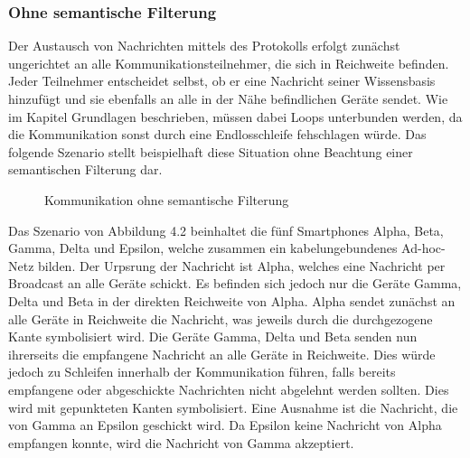 \subsubsection{Ohne semantische Filterung}
Der Austausch von Nachrichten mittels des Protokolls erfolgt zunächst ungerichtet an alle Kommunikationsteilnehmer, die sich in Reichweite befinden. Jeder Teilnehmer entscheidet selbst, ob er eine Nachricht seiner Wissensbasis hinzufügt und sie ebenfalls an alle in der Nähe befindlichen Geräte sendet. Wie im Kapitel Grundlagen beschrieben, müssen dabei Loops unterbunden werden, da die Kommunikation sonst durch eine Endlosschleife fehschlagen würde. Das folgende Szenario stellt beispielhaft diese Situation ohne Beachtung einer semantischen  Filterung dar.
\begin{figure}[H]
	\centering
	\hspace*{1cm}
	\caption{Kommunikation ohne semantische Filterung}
	\label{fig:beispielszenario}
\end{figure}
Das Szenario von Abbildung 4.2 beinhaltet die fünf Smartphones Alpha, Beta, Gamma, Delta und Epsilon, welche zusammen ein kabelungebundenes Ad-hoc-Netz bilden. Der Urpsrung der Nachricht ist Alpha, welches eine Nachricht per Broadcast an alle Geräte schickt. Es befinden sich jedoch nur die Geräte Gamma, Delta und Beta in der direkten Reichweite von Alpha. Alpha sendet zunächst an alle Geräte in Reichweite die Nachricht, was jeweils durch die durchgezogene Kante symbolisiert wird. Die Geräte Gamma, Delta und Beta senden nun ihrerseits die empfangene Nachricht an alle Geräte in Reichweite. Dies würde jedoch zu Schleifen innerhalb der Kommunikation führen, falls bereits empfangene oder abgeschickte Nachrichten nicht abgelehnt werden sollten. Dies wird mit gepunkteten Kanten symbolisiert. Eine Ausnahme ist die Nachricht, die von Gamma an Epsilon geschickt wird. Da Epsilon keine Nachricht von Alpha empfangen konnte, wird die Nachricht von Gamma akzeptiert. 
